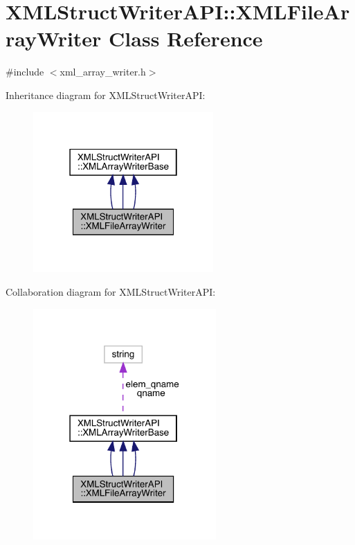 \hypertarget{classXMLStructWriterAPI_1_1XMLFileArrayWriter}{}\section{X\+M\+L\+Struct\+Writer\+A\+PI\+:\+:X\+M\+L\+File\+Array\+Writer Class Reference}
\label{classXMLStructWriterAPI_1_1XMLFileArrayWriter}


{\ttfamily \#include $<$xml\+\_\+array\+\_\+writer.\+h$>$}



Inheritance diagram for X\+M\+L\+Struct\+Writer\+A\+PI\+:
\nopagebreak
\begin{figure}[H]
\begin{center}
\leavevmode
\includegraphics[width=195pt]{d3/d88/classXMLStructWriterAPI_1_1XMLFileArrayWriter__inherit__graph}
\end{center}
\end{figure}


Collaboration diagram for X\+M\+L\+Struct\+Writer\+A\+PI\+:
\nopagebreak
\begin{figure}[H]
\begin{center}
\leavevmode
\includegraphics[width=198pt]{d8/d22/classXMLStructWriterAPI_1_1XMLFileArrayWriter__coll__graph}
\end{center}
\end{figure}

